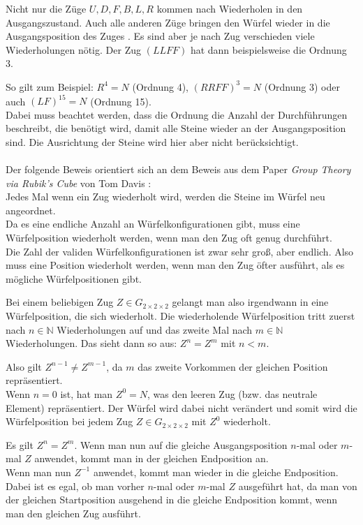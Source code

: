 \documentclass[12pt,a4paper, usenames, dvipsnames]{article}
\newcommand{\Gtwo}{\ensuremath{G_{2\times 2\times 2}}}
\begin{document}
Nicht nur die Züge $U, D, F, B, L, R$ kommen nach Wiederholen in den Ausgangszustand. Auch alle anderen Züge bringen den Würfel wieder in die Ausgangsposition des Zuges \cite{TD}. Es sind aber je nach Zug verschieden viele Wiederholungen nötig. Der Zug $(LLFF)$ hat dann beispielsweise die Ordnung 3.


So gilt zum Beispiel: ${R^4= N}$ (Ordnung 4), ${(RRFF)^3 = N}$ (Ordnung 3) oder auch ${(LF)^{15}=N}$ (Ordnung 15).\\ Dabei muss beachtet werden, dass die Ordnung die Anzahl der Durchführungen beschreibt, die benötigt wird, damit alle Steine wieder an der Ausgangsposition sind. Die Ausrichtung der Steine wird hier aber nicht berücksichtigt. \\
\\
Der folgende Beweis orientiert sich an dem Beweis aus dem Paper \textit{Group Theory via Rubik's Cube} von Tom Davis \cite{TD}: \\
Jedes Mal wenn ein Zug wiederholt wird, werden die Steine im Würfel neu angeordnet. \\ 
Da es eine endliche Anzahl an Würfelkonfigurationen gibt, muss eine Würfelposition wiederholt werden, wenn man den Zug oft genug durchführt. \\
Die Zahl der validen Würfelkonfigurationen ist zwar sehr groß, aber endlich. Also muss eine Position wiederholt werden, wenn man den Zug öfter ausführt, als es mögliche Würfelpositionen gibt. 


Bei einem beliebigen Zug $Z \in \Gtwo$ gelangt man also irgendwann in eine Würfelposition, die sich wiederholt. Die wiederholende Würfelposition tritt zuerst nach $n \in \mathbb{N}$ Wiederholungen auf und das zweite Mal nach $m \in \mathbb{N}$ Wiederholungen. Das sieht dann so aus: $Z^n=Z^m$ mit $n < m$. 


Also gilt $Z^{n-1} \neq Z^{m-1}$, da $m$ das zweite Vorkommen der gleichen Position repräsentiert. \\
Wenn $n=0$ ist, hat man $Z^0=N$, was den leeren Zug (bzw. das neutrale Element) repräsentiert. Der Würfel wird dabei nicht verändert und somit wird die Würfelposition bei jedem Zug $Z \in \Gtwo$ mit $Z^0$ wiederholt. 


Es gilt $Z^n = Z^m$. Wenn man nun auf die gleiche Ausgangsposition $n$-mal oder $m$-mal $Z$ anwendet, kommt man in der gleichen Endposition an. \\
Wenn man nun $Z^{-1}$ anwendet, kommt man wieder in die gleiche Endposition. Dabei ist es egal, ob man vorher $n$-mal oder $m$-mal $Z$ ausgeführt hat, da man von der gleichen Startposition ausgehend in die gleiche Endposition kommt, wenn man den gleichen Zug ausführt. 
\end{document}
